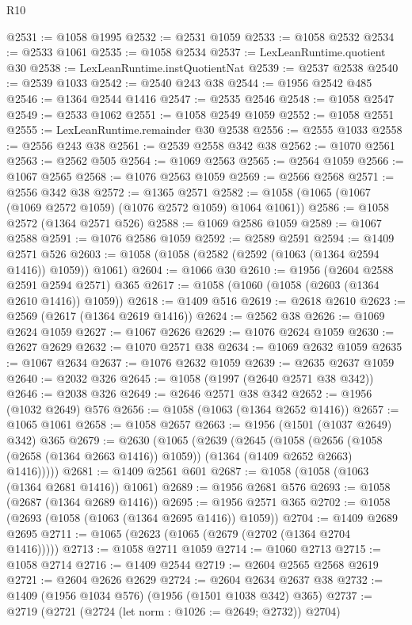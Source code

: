 \begin{lexlean}{R10}
\begin{coremodule}
@2531 := @1058 @1995
@2532 := @2531 @1059
@2533 := @1058 @2532
@2534 := @2533 @1061
@2535 := @1058 @2534
@2537 := LexLeanRuntime.quotient @30
@2538 := LexLeanRuntime.instQuotientNat
@2539 := @2537 @2538
@2540 := @2539 @1033
@2542 := @2540 @243 @38
@2544 := @1956 @2542 @485
@2546 := @1364 @2544 @1416
@2547 := @2535 @2546
@2548 := @1058 @2547
@2549 := @2533 @1062
@2551 := @1058 @2549 @1059
@2552 := @1058 @2551
@2555 := LexLeanRuntime.remainder @30 @2538
@2556 := @2555 @1033
@2558 := @2556 @243 @38
@2561 := @2539 @2558 @342 @38
@2562 := @1070 @2561
@2563 := @2562 @505
@2564 := @1069 @2563
@2565 := @2564 @1059
@2566 := @1067 @2565
@2568 := @1076 @2563 @1059
@2569 := @2566 @2568
@2571 := @2556 @342 @38
@2572 := @1365 @2571
@2582 := @1058 (@1065 (@1067 (@1069 @2572 @1059) (@1076 @2572 @1059) @1064 @1061))
@2586 := @1058 @2572 (@1364 @2571 @526)
@2588 := @1069 @2586 @1059
@2589 := @1067 @2588
@2591 := @1076 @2586 @1059
@2592 := @2589 @2591
@2594 := @1409 @2571 @526
@2603 := @1058 (@1058 (@2582 (@2592 (@1063 (@1364 @2594 @1416)) @1059)) @1061)
@2604 := @1066 @30
@2610 := @1956 (@2604 @2588 @2591 @2594 @2571) @365
@2617 := @1058 (@1060 (@1058 (@2603 (@1364 @2610 @1416)) @1059))
@2618 := @1409 @516
@2619 := @2618 @2610
@2623 := @2569 (@2617 (@1364 @2619 @1416))
@2624 := @2562 @38
@2626 := @1069 @2624 @1059
@2627 := @1067 @2626
@2629 := @1076 @2624 @1059
@2630 := @2627 @2629
@2632 := @1070 @2571 @38
@2634 := @1069 @2632 @1059
@2635 := @1067 @2634
@2637 := @1076 @2632 @1059
@2639 := @2635 @2637 @1059
@2640 := @2032 @326
@2645 := @1058 (@1997 (@2640 @2571 @38 @342))
@2646 := @2038 @326
@2649 := @2646 @2571 @38 @342
@2652 := @1956 (@1032 @2649) @576
@2656 := @1058 (@1063 (@1364 @2652 @1416))
@2657 := @1065 @1061
@2658 := @1058 @2657
@2663 := @1956 (@1501 (@1037 @2649) @342) @365
@2679 := @2630
    (@1065
      (@2639
        (@2645
          (@1058
            (@2656 (@1058 (@2658 (@1364 @2663 @1416)) @1059))
            (@1364 (@1409 @2652 @2663) @1416)))))
@2681 := @1409 @2561 @601
@2687 := @1058 (@1058 (@1063 (@1364 @2681 @1416)) @1061)
@2689 := @1956 @2681 @576
@2693 := @1058 (@2687 (@1364 @2689 @1416))
@2695 := @1956 @2571 @365
@2702 := @1058 (@2693 (@1058 (@1063 (@1364 @2695 @1416)) @1059))
@2704 := @1409 @2689 @2695
@2711 := @1065 (@2623 (@1065 (@2679 (@2702 (@1364 @2704 @1416)))))
@2713 := @1058 @2711 @1059
@2714 := @1060 @2713
@2715 := @1058 @2714
@2716 := @1409 @2544
@2719 := @2604 @2565 @2568 @2619
@2721 := @2604 @2626 @2629
@2724 := @2604 @2634 @2637 @38
@2732 := @1409 (@1956 @1034 @576) (@1956 (@1501 @1038 @342) @365)
@2737 := @2719 (@2721 (@2724 (let norm : @1026 := @2649; @2732)) @2704)

\end{coremodule}
\end{lexlean}
